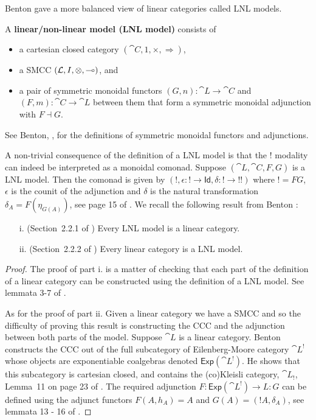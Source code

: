 Benton gave a more balanced view of linear categories called LNL
models.
\begin{definition}
  \label{def:LNL-model}
  A \textbf{linear/non-linear model (LNL model)} consists of
  \begin{itemize}
  \item a cartesian closed category $(\cat{C}, 1, \times,
    \Rightarrow)$,
  \item a SMCC $(\mathcal{L},I,\otimes,\multimap)$, and
  \item a pair of symmetric monoidal functors $(G,n) : \cat{L} \to
    \cat{C}$ and $(F,m) : \cat{C} \to \cat{L}$ between them that form
    a symmetric monoidal adjunction with $F \dashv G$.
  \end{itemize}
  See Benton, \cite{Benton:1994}, for the definitions of symmetric
  monoidal functors and adjunctions.
\end{definition}
A non-trivial consequence of the definition of a LNL model is that the
$!$ modality can indeed be interpreted as a monoidal comonad.  Suppose
$(\cat{L}, \cat{C},F,G)$ is a LNL model. Then the comonad is given by
$(\mathop{!}, \epsilon : \mathop{!} \to \mathsf{Id}, \delta :
\mathop{!} \to \mathop{!!})$
where $! = FG$, $\epsilon$ is the counit of the adjunction and
$\delta$ is the natural transformation $\delta_A = F(\eta_{G(A)})$,
see page 15 of \cite{Benton:1994}.  We recall the following result
from Benton \cite{Benton:1994}:
\begin{theorem}
  \label{thm:lnl_models_are_linear_categories}
  \begin{itemize}
  \item[i.] (Section~2.2.1 of \cite{Benton:1994}) Every LNL model is a linear category.
  \item[ii.] (Section~2.2.2 of \cite{Benton:1994}) Every linear category is a LNL model.
  \end{itemize}
\end{theorem}
\begin{proof}
  The proof of part i. is a matter of checking that each part of the
  definition of a linear category can be constructed using the
  definition of a LNL model. See lemmata 3-7 of \cite{Benton:1994}.

  As for the proof of part ii. Given a linear category we have a SMCC and so the difficulty of
  proving this result is constructing the CCC and the adjunction
  between both parts of the model.  Suppose $\cat{L}$ is a linear
  category.  Benton constructs the CCC out of the full subcategory of
  Eilenberg-Moore category $\cat{L}^!$ whose objects are exponentiable
  coalgebras denoted $\mathsf{Exp}(\cat{L}^!)$.  He shows that
  this subcategory is cartesian closed, and contains the (co)Kleisli
  category, $\cat{L}_!$, Lemma~11 on page 23 of \cite{Benton:1994}.
  The required adjunction
  $F : \mathsf{Exp}(\cat{L}^!) \to L : G$ can be defined using the
  adjunct functors $F(A,h_A) = A$ and $G(A) = (!A,\delta_A)$, see
  lemmata 13 - 16 of \cite{Benton:1994}.
\end{proof}

